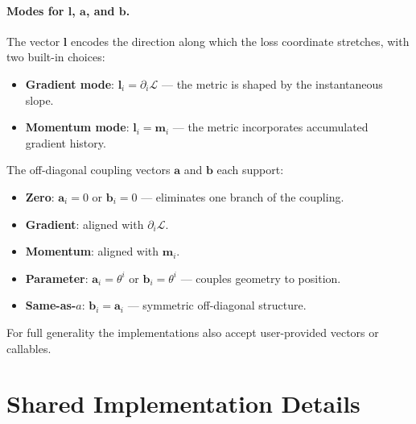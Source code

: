 \documentclass{article}
\newcommand{\loss}{\mathcal{L}}
\newcommand{\vecb}[1]{\boldsymbol{#1}}
\begin{document}
\paragraph{Modes for $\vecb{l}$, $\vecb{a}$, and $\vecb{b}$.}
The vector $\vecb{l}$ encodes the direction along which the loss coordinate stretches, with two built-in choices:
\begin{itemize}
    \item \textbf{Gradient mode}: $\vecb{l}_i = \partial_i\loss$ --- the metric is shaped by the instantaneous slope.
    \item \textbf{Momentum mode}: $\vecb{l}_i = \vecb{m}_i$ --- the metric incorporates accumulated gradient history.
\end{itemize}
The off-diagonal coupling vectors $\vecb{a}$ and $\vecb{b}$ each support:
\begin{itemize}
    \item \textbf{Zero}: $\vecb{a}_i=0$ or $\vecb{b}_i=0$ --- eliminates one branch of the coupling.
    \item \textbf{Gradient}: aligned with $\partial_i\loss$.
    \item \textbf{Momentum}: aligned with $\vecb{m}_i$.
    \item \textbf{Parameter}: $\vecb{a}_i=\theta^i$ or $\vecb{b}_i=\theta^i$ --- couples geometry to position.
    \item \textbf{Same-as-$a$}: $\vecb{b}_i=\vecb{a}_i$ --- symmetric off-diagonal structure.
\end{itemize}
For full generality the implementations also accept user-provided vectors or callables.


\section{Shared Implementation Details}\label{sec:shared}
\end{document}
